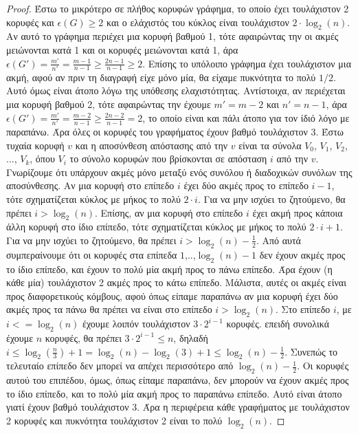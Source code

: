 \documentclass[a4paper, oneside, 11pt]{article}
\theoremstyle{definition}
\begin{document}
\begin{enumerate}
   \begin{proof}
Έστω το μικρότερο σε πλήθος κορυφών γράφημα, το οποίο έχει τουλάχιστον 2 κορυφές και $\epsilon(G) \geq 2$ και ο ελάχιστός του κύκλος είναι τουλάχιστον $2\cdot \log_2 (n)$. Αν αυτό το γράφημα περιέχει
μια κορυφή βαθμού 1, τότε αφαιρώντας την οι ακμές μειώνονται κατά 1 και οι κορυφές μειώνονται κατά 1, άρα $\epsilon (G') = \frac{m'}{n'}=\frac{m-1}{n-1}\geq \frac{2n-1}{n-1}\geq 2$. Επίσης το υπόλοιπο
γράφημα έχει τουλάχιστον μια ακμή, αφού αν πριν τη διαγραφή είχε μόνο μία, θα είχαμε πυκνότητα το πολύ $1/2$. Αυτό όμως είναι άτοπο λόγω της υπόθεσης ελαχιστότητας. Αντίστοιχα, αν περιέχεται μια κορυφή
βαθμού 2, τότε αφαιρώντας την έχουμε $m'=m-2$ και $n'=n-1$, άρα $\epsilon(G')=\frac{m'}{n'}=\frac{m-2}{n-1}\geq \frac{2n-2}{n-1}=2$, το οποίο είναι και πάλι άτοπο για τον ίδιό λόγο με παραπάνω. Άρα όλες
οι κορυφές του γραφήματος έχουν βαθμό τουλάχιστον 3. Έστω τυχαία κορυφή $v$ και η αποσύνθεση απόστασης από την $v$ είναι τα σύνολα $V_0$, $V_1$, $V_2$, ..., $V_k$, όπου $V_i$ το σύνολο κορυφών που 
βρίσκονται σε
απόσταση $i$ από την $v$. Γνωρίζουμε ότι υπάρχουν ακμές μόνο μεταξύ ενός συνόλου ή διαδοχικών συνόλων της αποσύνθεσης. Αν μια κορυφή στο επίπεδο $i$ έχει δύο ακμές προς το επίπεδο $i-1$, τότε σχηματίζεται
κύκλος με μήκος το πολύ $2\cdot i$. Για να μην ισχύει το ζητούμενο, θα πρέπει $i>\log_2 (n)$. Επίσης, αν μια κορυφή στο επίπεδο $i$ έχει ακμή προς κάποια άλλη κορυφή στο ίδιο επίπεδο, τότε σχηματίζεται
κύκλος με μήκος το πολύ $2\cdot i + 1$. Για να μην ισχύει το ζητούμενο, θα πρέπει $i>\log_2 (n) - \frac{1}{2}$. Από αυτά συμπεραίνουμε ότι οι κορυφές στα επίπεδα $1$,..,$\log_2 (n) - 1$ δεν έχουν ακμές προς το ίδιο επίπεδο, και έχουν το πολύ μία ακμή προς το πάνω επίπεδο. Άρα έχουν (η κάθε μία) τουλάχιστον 2 ακμές προς το κάτω επίπεδο. Μάλιστα, αυτές οι ακμές είναι προς διαφορετικούς κόμβους, αφού όπως είπαμε
παραπάνω αν μια κορυφή έχει δύο ακμές προς τα πάνω θα πρέπει να είναι στο επίπεδο $i>\log_2 (n)$. Στο επίπεδο $i$, με $i<=\log_2 (n)$ έχουμε λοιπόν τουλάχιστον $3\cdot 2^{i-1}$ κορυφές. επειδή συνολικά
έχουμε $n$ κορυφές, θα πρέπει $3\cdot 2^{i-1} \leq n$, δηλαδή $i \leq \log_2 (\frac{n}{3}) + 1 = \log_2 (n) - \log_2 (3) + 1 \leq \log_2 (n) - \frac{1}{2}$. Συνεπώς το τελευταίο επίπεδο δεν μπορεί να
απέχει περισσότερο από $\log_2 (n) - \frac{1}{2}$. Οι κορυφές αυτού του επιπέδου, όμως, όπως είπαμε παραπάνω, δεν μπορούν να έχουν ακμές προς το ίδιο επίπεδο, και το πολύ μία ακμή προς το παραπάνω επίπεδο.
Αυτό είναι άτοπο γιατί έχουν βαθμό τουλάχιστον 3. Άρα η περιφέρεια κάθε γραφήματος με τουλάχιστον 2 κορυφές και πυκνότητα τουλάχιστον 2 είναι το πολύ $\log_2 (n)$.
   \end{proof}
\end{enumerate}
\end{document}
